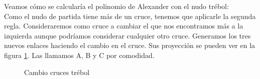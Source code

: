 Veamos cómo se calcularía el polinomio de Alexander con el nudo trébol:\\
Como el nudo de partida tiene más de un cruce, tenemos que aplicarle la segunda regla. Consideraremos como cruce a cambiar el que nos encontramos más a la izquierda aunque podríamos considerar cualquier otro cruce. Generamos los tres nuevos enlaces haciendo el cambio en el cruce. Sus proyección se pueden ver en la figura \ref{alex2}. Las llamamos A, B y C por comodidad. 
\begin{figure}[h!]
	\centering
	\caption{Cambio cruces trébol}
	\label{alex2} 
\end{figure}

